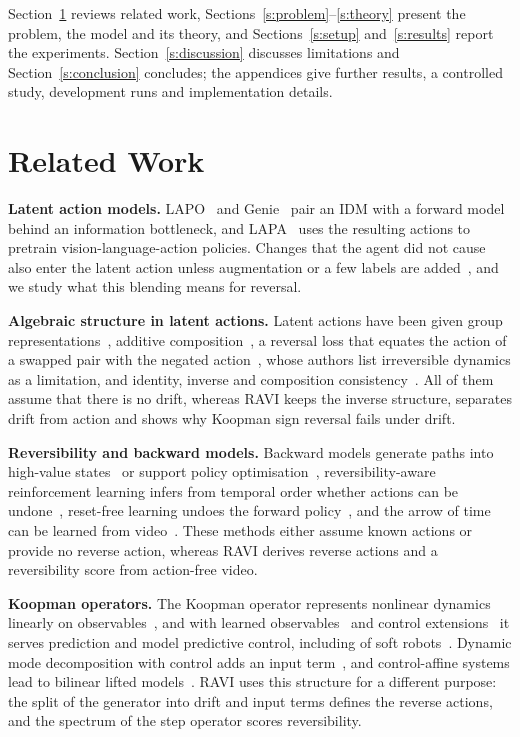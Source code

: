 \documentclass{jcse}
\newcommand{\method}{RAVI}
\begin{document}
Section~\ref{s:related} reviews related work, Sections~\ref{s:problem}--\ref{s:theory} present the problem, the model and its theory, and Sections~\ref{s:setup} and~\ref{s:results} report the experiments. Section~\ref{s:discussion} discusses limitations and Section~\ref{s:conclusion} concludes; the appendices give further results, a controlled study, development runs and implementation details.

\section{Related Work} \label{s:related}

\textbf{Latent action models.}
LAPO~\cite{schmidt2024lapo} and Genie~\cite{bruce2024genie} pair an IDM with a forward model behind an information bottleneck, and LAPA~\cite{ye2025lapa} uses the resulting actions to pretrain vision-language-action policies.
Changes that the agent did not cause also enter the latent action unless augmentation or a few labels are added~\cite{zhang2025lams}, and we study what this blending means for reversal.

\textbf{Algebraic structure in latent actions.}
Latent actions have been given group representations~\cite{keurti2023hae}, additive composition~\cite{wei2026aclam}, a reversal loss that equates the action of a swapped pair with the negated action~\cite{tang2026alam}, whose authors list irreversible dynamics as a limitation, and identity, inverse and composition consistency~\cite{wang2026groupactions}.
All of them assume that there is no drift, whereas {\method} keeps the inverse structure, separates drift from action and shows why Koopman sign reversal fails under drift.

\textbf{Reversibility and backward models.}
Backward models generate paths into high-value states~\cite{goyal2019recall} or support policy optimisation~\cite{lai2020bmpo}, reversibility-aware reinforcement learning infers from temporal order whether actions can be undone~\cite{grinsztajn2021reversibility}, reset-free learning undoes the forward policy~\cite{eysenbach2018leave}, and the arrow of time can be learned from video~\cite{wei2018arrow}.
These methods either assume known actions or provide no reverse action, whereas {\method} derives reverse actions and a reversibility score from action-free video.

\textbf{Koopman operators.}
The Koopman operator represents nonlinear dynamics linearly on observables~\cite{koopman1931,mezic2005spectral}, and with learned observables~\cite{lusch2018deep} and control extensions~\cite{korda2018koopman,bruder2021bilinear,brunton2022modern} it serves prediction and model predictive control, including of soft robots~\cite{bruder2019soft}.
Dynamic mode decomposition with control adds an input term~\cite{proctor2016dmdc}, and control-affine systems lead to bilinear lifted models~\cite{goswami2017global,bruder2021bilinear}.
{\method} uses this structure for a different purpose: the split of the generator into drift and input terms defines the reverse actions, and the spectrum of the step operator scores reversibility.
\end{document}
